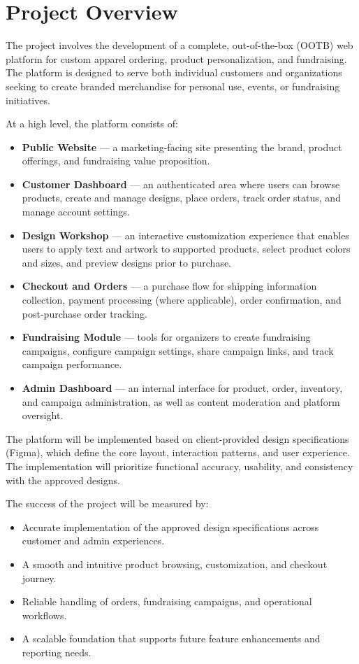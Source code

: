 \section{Project Overview}

The project involves the development of a complete, out-of-the-box (OOTB) web
platform for custom apparel ordering, product personalization, and fundraising.
The platform is designed to serve both individual customers and organizations
seeking to create branded merchandise for personal use, events, or fundraising
initiatives.

At a high level, the platform consists of:
\begin{itemize}[leftmargin=1.5em]
    \item \textbf{Public Website} --- a marketing-facing site presenting the brand,
    product offerings, and fundraising value proposition.
    \item \textbf{Customer Dashboard} --- an authenticated area where users can browse
    products, create and manage designs, place orders, track order status, and manage
    account settings.
    \item \textbf{Design Workshop} --- an interactive customization experience that enables
    users to apply text and artwork to supported products, select product colors and sizes,
    and preview designs prior to purchase.
    \item \textbf{Checkout and Orders} --- a purchase flow for shipping information collection,
    payment processing (where applicable), order confirmation, and post-purchase order tracking.
    \item \textbf{Fundraising Module} --- tools for organizers to create fundraising campaigns,
    configure campaign settings, share campaign links, and track campaign performance.
    \item \textbf{Admin Dashboard} --- an internal interface for product, order, inventory, and
    campaign administration, as well as content moderation and platform oversight.
\end{itemize}

The platform will be implemented based on client-provided design specifications
(Figma), which define the core layout, interaction patterns, and user experience.
The implementation will prioritize functional accuracy, usability, and consistency
with the approved designs.

The success of the project will be measured by:
\begin{itemize}[leftmargin=1.5em]
    \item Accurate implementation of the approved design specifications across customer and admin experiences.
    \item A smooth and intuitive product browsing, customization, and checkout journey.
    \item Reliable handling of orders, fundraising campaigns, and operational workflows.
    \item A scalable foundation that supports future feature enhancements and reporting needs.
\end{itemize}
